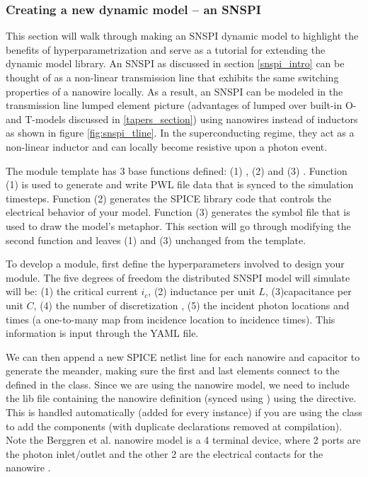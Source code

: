 
\subsubsection{Creating a new dynamic model -- an SNSPI}

This section will walk through making an SNSPI dynamic model to highlight the benefits
of hyperparametrization and serve as a tutorial for extending the  dynamic model library. 
An SNSPI as discussed in section \ref{snspi_intro} can be thought
of as a non-linear transmission line that exhibits the same switching properties of a nanowire
locally. As a result, an SNSPI can be modeled in the transmission line lumped element picture
(advantages of lumped over built-in O- and T-models discussed in \ref{tapers_section})
using nanowires instead of inductors as shown in figure
\ref{fig:snspi_tline}. In the superconducting regime, they act as a non-linear
inductor and can locally become resistive upon a photon event.

\begin{sloppypar}
The  module template has 3 base functions defined: (1) ,
(2)  and (3) . Function (1) is used to generate 
and write PWL file data that is synced to the simulation timesteps. Function (2)
generates the SPICE library code that controls the electrical behavior of your model.
Function (3) generates the symbol file that is used to draw the model's metaphor. This
section will go through modifying the second function and leaves (1) and (3) unchanged
from the template.
\end{sloppypar}

To develop a module, first define the hyperparameters involved to design your module.
The five degrees of freedom the distributed SNSPI model will simulate will be: (1) the
critical current $i_c$, (2) inductance per unit $L$, (3)capacitance per unit $C$, 
(4) the number of discretization
, (5) the incident photon locations and times (a one-to-many map from incidence 
location to incidence times). This information is input through the YAML file.

We can then append a new SPICE netlist line for each nanowire and capacitor to generate the
meander, making sure the first and last elements connect to the  defined in the 
class. Since we are using the nanowire model, we need to include the lib file containing
the nanowire definition (synced using ) using the  directive. This is
handled automatically (added for every instance) if you are using the  
class to add the components
(with duplicate declarations removed at compilation).
Note the
Berggren et al. nanowire model is a 4 terminal device, where 2 ports are the photon inlet/outlet
and the other 2 are the electrical contacts for the nanowire \cite{karl_spice}. 

